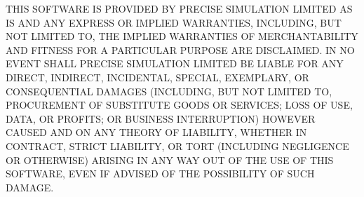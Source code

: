 T\+H\+IS S\+O\+F\+T\+W\+A\+RE IS P\+R\+O\+V\+I\+D\+ED BY P\+R\+E\+C\+I\+SE S\+I\+M\+U\+L\+A\+T\+I\+ON L\+I\+M\+I\+T\+ED \textquotesingle{}\textquotesingle{}AS IS\textquotesingle{}\textquotesingle{} A\+ND A\+NY E\+X\+P\+R\+E\+SS OR I\+M\+P\+L\+I\+ED W\+A\+R\+R\+A\+N\+T\+I\+ES, I\+N\+C\+L\+U\+D\+I\+NG, B\+UT N\+OT L\+I\+M\+I\+T\+ED TO, T\+HE I\+M\+P\+L\+I\+ED W\+A\+R\+R\+A\+N\+T\+I\+ES OF M\+E\+R\+C\+H\+A\+N\+T\+A\+B\+I\+L\+I\+TY A\+ND F\+I\+T\+N\+E\+SS F\+OR A P\+A\+R\+T\+I\+C\+U\+L\+AR P\+U\+R\+P\+O\+SE A\+RE D\+I\+S\+C\+L\+A\+I\+M\+ED. IN NO E\+V\+E\+NT S\+H\+A\+LL P\+R\+E\+C\+I\+SE S\+I\+M\+U\+L\+A\+T\+I\+ON L\+I\+M\+I\+T\+ED BE L\+I\+A\+B\+LE F\+OR A\+NY D\+I\+R\+E\+CT, I\+N\+D\+I\+R\+E\+CT, I\+N\+C\+I\+D\+E\+N\+T\+AL, S\+P\+E\+C\+I\+AL, E\+X\+E\+M\+P\+L\+A\+RY, OR C\+O\+N\+S\+E\+Q\+U\+E\+N\+T\+I\+AL D\+A\+M\+A\+G\+ES (I\+N\+C\+L\+U\+D\+I\+NG, B\+UT N\+OT L\+I\+M\+I\+T\+ED TO, P\+R\+O\+C\+U\+R\+E\+M\+E\+NT OF S\+U\+B\+S\+T\+I\+T\+U\+TE G\+O\+O\+DS OR S\+E\+R\+V\+I\+C\+ES; L\+O\+SS OF U\+SE, D\+A\+TA, OR P\+R\+O\+F\+I\+TS; OR B\+U\+S\+I\+N\+E\+SS I\+N\+T\+E\+R\+R\+U\+P\+T\+I\+ON) H\+O\+W\+E\+V\+ER C\+A\+U\+S\+ED A\+ND ON A\+NY T\+H\+E\+O\+RY OF L\+I\+A\+B\+I\+L\+I\+TY, W\+H\+E\+T\+H\+ER IN C\+O\+N\+T\+R\+A\+CT, S\+T\+R\+I\+CT L\+I\+A\+B\+I\+L\+I\+TY, OR T\+O\+RT (I\+N\+C\+L\+U\+D\+I\+NG N\+E\+G\+L\+I\+G\+E\+N\+CE OR O\+T\+H\+E\+R\+W\+I\+SE) A\+R\+I\+S\+I\+NG IN A\+NY W\+AY O\+UT OF T\+HE U\+SE OF T\+H\+IS S\+O\+F\+T\+W\+A\+RE, E\+V\+EN IF A\+D\+V\+I\+S\+ED OF T\+HE P\+O\+S\+S\+I\+B\+I\+L\+I\+TY OF S\+U\+CH D\+A\+M\+A\+GE. 